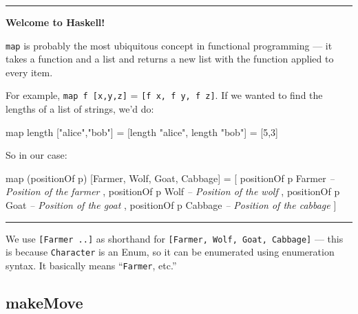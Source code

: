 \documentclass[]{article}
\newenvironment{Shaded}{}{}
\newcommand{\CommentTok}[1]{\textcolor[rgb]{0.38,0.63,0.69}{\textit{#1}}}
\newcommand{\DataTypeTok}[1]{\textcolor[rgb]{0.56,0.13,0.00}{#1}}
\newcommand{\DecValTok}[1]{\textcolor[rgb]{0.25,0.63,0.44}{#1}}
\newcommand{\FunctionTok}[1]{\textcolor[rgb]{0.02,0.16,0.49}{#1}}
\newcommand{\NormalTok}[1]{#1}
\newcommand{\StringTok}[1]{\textcolor[rgb]{0.25,0.44,0.63}{#1}}
\begin{document}
\begin{center}\rule{0.5\linewidth}{\linethickness}\end{center}

\textbf{Welcome to Haskell!}

\texttt{map} is probably the most ubiquitous concept in functional programming
--- it takes a function and a list and returns a new list with the function
applied to every item.

For example, \texttt{map\ f\ {[}x,y,z{]}} = \texttt{{[}f\ x,\ f\ y,\ f\ z{]}}.
If we wanted to find the lengths of a list of strings, we'd do:

\begin{Shaded}
\begin{Highlighting}[]
\NormalTok{map length [}\StringTok{"alice"}\NormalTok{,}\StringTok{"bob"}\NormalTok{]}
\FunctionTok{=}\NormalTok{ [length }\StringTok{"alice"}\NormalTok{, length }\StringTok{"bob"}\NormalTok{]}
\FunctionTok{=}\NormalTok{ [}\DecValTok{5}\NormalTok{,}\DecValTok{3}\NormalTok{]}
\end{Highlighting}
\end{Shaded}

So in our case:

\begin{Shaded}
\begin{Highlighting}[]
\NormalTok{map (positionOf p) [}\DataTypeTok{Farmer}\NormalTok{, }\DataTypeTok{Wolf}\NormalTok{, }\DataTypeTok{Goat}\NormalTok{, }\DataTypeTok{Cabbage}\NormalTok{]}
\FunctionTok{=}\NormalTok{ [ positionOf p }\DataTypeTok{Farmer}         \CommentTok{-- Position of the farmer}
\NormalTok{  , positionOf p }\DataTypeTok{Wolf}           \CommentTok{-- Position of the wolf}
\NormalTok{  , positionOf p }\DataTypeTok{Goat}           \CommentTok{-- Position of the goat}
\NormalTok{  , positionOf p }\DataTypeTok{Cabbage}        \CommentTok{-- Position of the cabbage}
\NormalTok{  ]}
\end{Highlighting}
\end{Shaded}

\begin{center}\rule{0.5\linewidth}{\linethickness}\end{center}

We use \texttt{{[}Farmer\ ..{]}} as shorthand for
\texttt{{[}Farmer,\ Wolf,\ Goat,\ Cabbage{]}} --- this is because
\texttt{Character} is an Enum, so it can be enumerated using enumeration syntax.
It basically means ``\texttt{Farmer}, etc.''

\hypertarget{makemove}{%
\subsection{makeMove}\label{makemove}}
\end{document}
